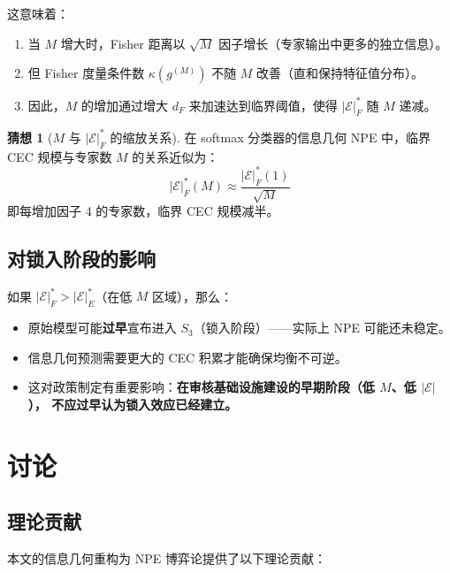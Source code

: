 \documentclass[12pt,a4paper]{article}
\theoremstyle{definition}
\newtheorem{conjecture}{猜想}[section]
\theoremstyle{remark}
\newcommand{\Fisher}{g}
\begin{document}
这意味着：
\begin{enumerate}[label=(\roman*)]
    \item 当 $M$ 增大时，Fisher 距离以 $\sqrt{M}$ 因子增长（专家输出中更多的独立信息）。
    \item 但 Fisher 度量条件数 $\kappa(\Fisher^{(M)})$ 不随 $M$ 改善（直和保持特征值分布）。
    \item 因此，$M$ 的增加通过增大 $d_F$ 来加速达到临界阈值，使得 $|\mathcal{E}|^*_F$ 随 $M$ 递减。
\end{enumerate}

\begin{conjecture}[$M$ 与 $|\mathcal{E}|^*_F$ 的缩放关系]
在 softmax 分类器的信息几何 NPE 中，临界 CEC 规模与专家数 $M$ 的关系近似为：
\begin{equation}
    |\mathcal{E}|^*_F(M) \approx \frac{|\mathcal{E}|^*_F(1)}{\sqrt{M}} \label{eq:M_scaling}
\end{equation}
即每增加因子 4 的专家数，临界 CEC 规模减半。
\end{conjecture}

\subsection{对锁入阶段的影响}

如果 $|\mathcal{E}|^*_F > |\mathcal{E}|^*_E$（在低 $M$ 区域），那么：
\begin{itemize}
    \item 原始模型可能\textbf{过早}宣布进入 $S_3$（锁入阶段）——实际上 NPE 可能还未稳定。
    \item 信息几何预测需要更大的 CEC 积累才能确保均衡不可逆。
    \item 这对政策制定有重要影响：\textbf{在审核基础设施建设的早期阶段（低 $M$、低 $|\mathcal{E}|$），
    不应过早认为锁入效应已经建立。}
\end{itemize}

\section{讨论}

\subsection{理论贡献}

本文的信息几何重构为 NPE 博弈论提供了以下理论贡献：
\end{document}
